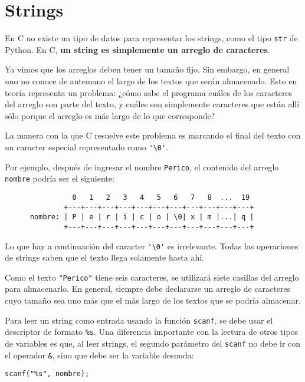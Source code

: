 \section{Strings}

En C no existe un tipo de datos para representar los strings, como el
tipo \lstinline!str! de Python. En C, \textbf{un string es simplemente
un arreglo de caracteres}.

Ya vimos que los arreglos deben tener un tamaño fijo. Sin embargo, en
general uno no conoce de antemano el largo de los textos que serán
almacenado. Esto en teoría representa un problema: ¿cómo sabe el
programa cuáles de los caracteres del arreglo son parte del texto, y
cuáles son simplemente caracteres que están allí sólo porque el arreglo
es más largo de lo que corresponde?

La manera con la que C resuelve este problema es marcando el final del
texto con un caracter especial representado como \lstinline!'\0'!.

Por ejemplo, después de ingresar el nombre \lstinline!Perico!, el
contenido del arreglo \lstinline!nombre! podría ser el siguiente:

\begin{verbatim}
                0   1   2   3   4   5   6   7   8  ...  19
              +---+---+---+---+---+---+---+---+---+---+---+
      nombre: | P | e | r | i | c | o | \0| x | m |...| q |
              +---+---+---+---+---+---+---+---+---+---+---+
\end{verbatim}

Lo que hay a continuación del caracter \lstinline!'\0'! es irrelevante.
Todas las operaciones de strings saben que el texto llega solamente
hasta ahí.

Como el texto \lstinline!"Perico"! tiene seis caracteres, se utilizará
siete casillas del arreglo para almacenarlo. En general, siempre debe
declararse un arreglo de caracteres cuyo tamaño sea uno más que el más
largo de los textos que se podría almacenar.

Para leer un string como entrada usando la función \lstinline!scanf!, se
debe usar el descriptor de formato \lstinline!%s!. Una diferencia
importante con la lectura de otros tipos de variables es que, al leer
strings, el segundo parámetro del \lstinline!scanf! no debe ir con el
operador \lstinline!&!, sino que debe ser la variable desnuda:

\begin{lstlisting}
scanf("%s", nombre);
\end{lstlisting}

